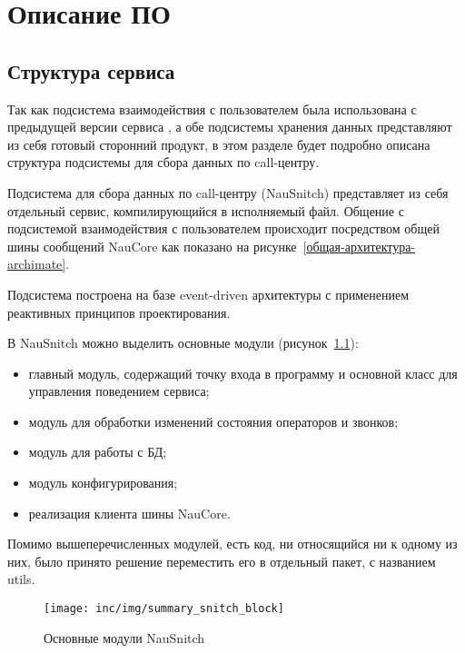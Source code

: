 \chapter{Описание ПО}
\label{ch:impl}

\section{Структура сервиса}

Так как подсистема взаимодействия с пользователем была использована
с предыдущей версии сервиса %
, а обе подсистемы хранения данных представляют из себя
готовый сторонний продукт, в этом разделе будет подробно описана
структура подсистемы для сбора данных по call-центру.

Подсистема для сбора данных по call-центру (NauSnitch) представляет из себя
отдельный сервис, компилирующийся в исполняемый файл.
Общение с подсистемой взаимодействия с пользователем
происходит посредством общей шины сообщений NauCore как показано на рисунке~\ref{общая-архитектура-archimate}.

Подсистема построена на базе event-driven архитектуры %
с применением реактивных принципов проектирования. %

В NauSnitch можно выделить основные модули (рисунок~\ref{pic:snitch:summary-block}):
\begin{itemize}
    \item главный модуль, содержащий точку входа в программу
    и основной класс для управления поведением сервиса;
    \item модуль для обработки изменений состояния операторов и звонков;
    \item модуль для работы с БД;
    \item модуль конфигурирования;
    \item реализация клиента шины NauCore.
\end{itemize}
Помимо вышеперечисленных модулей, есть код, ни относящийся ни к одному из них,
было принято решение переместить его в отдельный пакет, с названием utils.

\begin{figure}[ht]
    \centering
    \texttt{[image: inc/img/summary\_snitch\_block]}
    \caption{Основные модули NauSnitch}
    \label{pic:snitch:summary-block}
\end{figure}

